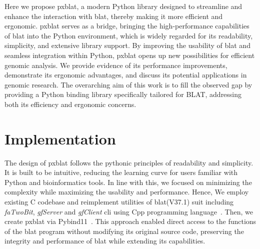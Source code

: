 Here we propose \gls{pxblat}, a modern Python library designed to streamline and enhance the interaction with \gls{blat}, thereby making it more efficient and ergonomic.
\gls{pxblat} serves as a bridge, bringing the high-performance capabilities of \gls{blat}  into the Python environment, which is widely regarded for its readability, simplicity, and extensive library support.
By improving the usability of \gls{blat}  and seamless integration within Python, \gls{pxblat} opens up new possibilities for efficient genomic analysis.
We provide evidence of its performance improvements, demonstrate its ergonomic advantages, and discuss its potential applications in genomic research.
The overarching aim of this work is to fill the observed gap by providing a Python binding library specifically tailored for BLAT, addressing both its efficiency and ergonomic concerns.



\section*{Implementation}\label{sec:implementation}


The design of \gls{pxblat} follows the pythonic principles of readability and simplicity.
It is built to be intuitive, reducing the learning curve for users familiar with Python and bioinformatics tools.
In line with this, we focused on minimizing the complexity while maximizing the usability and performance.
Hence, We employ existing C codebase and reimplement utilities of \gls{blat}(V37.1) suit  including \emph{faTwoBit}, \emph{gfServer} and \emph{gfClient} \gls{cli}  using Cpp programming language~\citep{kent2002blat}.
Then, we create \gls{pxblat} via Pybind11~\citep{pybind11}.
This approach enabled direct access to the functions of the \gls{blat} program without modifying its original source code, preserving the integrity and performance of \gls{blat} while extending its capabilities.

